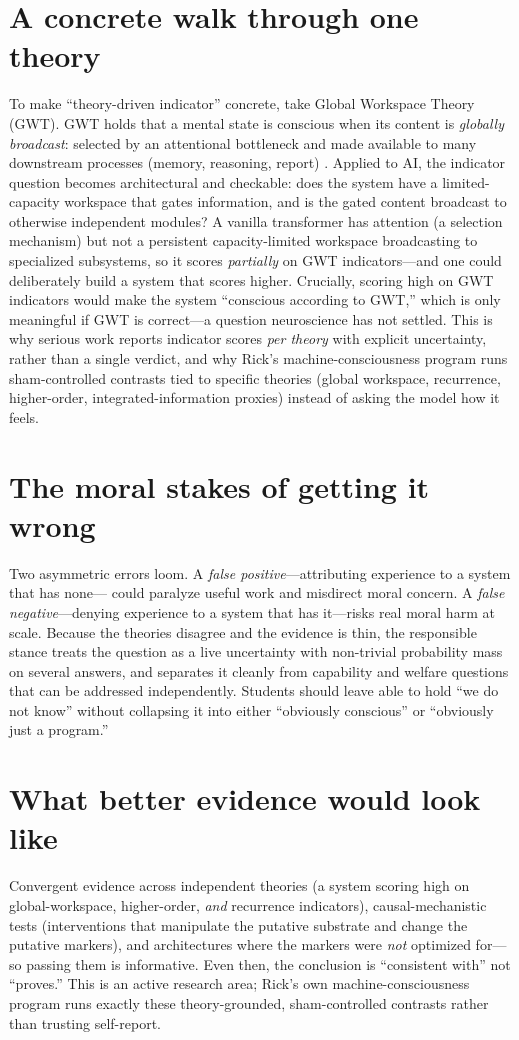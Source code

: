 \documentclass[11pt]{article}
\begin{document}
\section{A concrete walk through one theory}
To make ``theory-driven indicator'' concrete, take Global Workspace Theory (GWT). GWT holds that a
mental state is conscious when its content is \emph{globally broadcast}: selected by an attentional
bottleneck and made available to many downstream processes (memory, reasoning, report)
\citep{dehaene2014consciousness}. Applied to AI, the indicator question becomes architectural and
checkable: does the system have a limited-capacity workspace that gates information, and is the gated
content broadcast to otherwise independent modules? A vanilla transformer has attention (a selection
mechanism) but not a persistent capacity-limited workspace broadcasting to specialized subsystems, so it
scores \emph{partially} on GWT indicators---and one could deliberately build a system that scores higher.
Crucially, scoring high on GWT indicators would make the system ``conscious according to GWT,'' which is
only meaningful if GWT is correct---a question neuroscience has not settled. This is why serious work
reports indicator scores \emph{per theory} with explicit uncertainty, rather than a single verdict, and
why Rick's machine-consciousness program runs sham-controlled contrasts tied to specific theories (global
workspace, recurrence, higher-order, integrated-information proxies) instead of asking the model how it
feels.

\section{The moral stakes of getting it wrong}
Two asymmetric errors loom. A \emph{false positive}---attributing experience to a system that has none---
could paralyze useful work and misdirect moral concern. A \emph{false negative}---denying experience to a
system that has it---risks real moral harm at scale. Because the theories disagree and the evidence is
thin, the responsible stance treats the question as a live uncertainty with non-trivial probability mass
on several answers, and separates it cleanly from capability and welfare questions that can be addressed
independently. Students should leave able to hold ``we do not know'' without collapsing it into either
``obviously conscious'' or ``obviously just a program.''

\section{What better evidence would look like}
Convergent evidence across independent theories (a system scoring high on global-workspace,
higher-order, \emph{and} recurrence indicators), causal-mechanistic tests (interventions that
manipulate the putative substrate and change the putative markers), and architectures where the markers
were \emph{not} optimized for---so passing them is informative. Even then, the conclusion is
``consistent with'' not ``proves.'' This is an active research area; Rick's own machine-consciousness
program runs exactly these theory-grounded, sham-controlled contrasts rather than trusting self-report.
\end{document}
